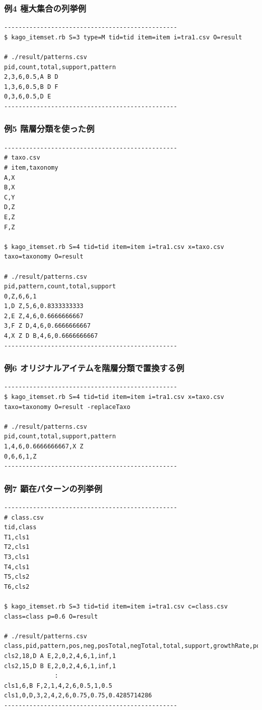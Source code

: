 \documentclass[a4paper]{jarticle}
\begin{document}
\subsubsection*{例4 極大集合の列挙例}

\begin{verbatim}
------------------------------------------------
$ kago_itemset.rb S=3 type=M tid=tid item=item i=tra1.csv O=result

# ./result/patterns.csv
pid,count,total,support,pattern
2,3,6,0.5,A B D
1,3,6,0.5,B D F
0,3,6,0.5,D E
------------------------------------------------
\end{verbatim}

\subsubsection*{例5 階層分類を使った例}

\begin{verbatim}
------------------------------------------------
# taxo.csv
# item,taxonomy
A,X
B,X
C,Y
D,Z
E,Z
F,Z

$ kago_itemset.rb S=4 tid=tid item=item i=tra1.csv x=taxo.csv taxo=taxonomy O=result

# ./result/patterns.csv
pid,pattern,count,total,support
0,Z,6,6,1
1,D Z,5,6,0.8333333333
2,E Z,4,6,0.6666666667
3,F Z D,4,6,0.6666666667
4,X Z D B,4,6,0.6666666667
------------------------------------------------
\end{verbatim}

\subsubsection*{例6 オリジナルアイテムを階層分類で置換する例}
\begin{verbatim}
------------------------------------------------
$ kago_itemset.rb S=4 tid=tid item=item i=tra1.csv x=taxo.csv taxo=taxonomy O=result -replaceTaxo

# ./result/patterns.csv
pid,count,total,support,pattern
1,4,6,0.6666666667,X Z
0,6,6,1,Z
------------------------------------------------
\end{verbatim}

\subsubsection*{例7 顕在パターンの列挙例}
\begin{verbatim}
------------------------------------------------
# class.csv
tid,class
T1,cls1
T2,cls1
T3,cls1
T4,cls1
T5,cls2
T6,cls2

$ kago_itemset.rb S=3 tid=tid item=item i=tra1.csv c=class.csv class=class p=0.6 O=result

# ./result/patterns.csv
class,pid,pattern,pos,neg,posTotal,negTotal,total,support,growthRate,postProb
cls2,18,D A E,2,0,2,4,6,1,inf,1
cls2,15,D B E,2,0,2,4,6,1,inf,1
              :
cls1,6,B F,2,1,4,2,6,0.5,1,0.5
cls1,0,D,3,2,4,2,6,0.75,0.75,0.4285714286
------------------------------------------------
\end{verbatim}
\end{document}
